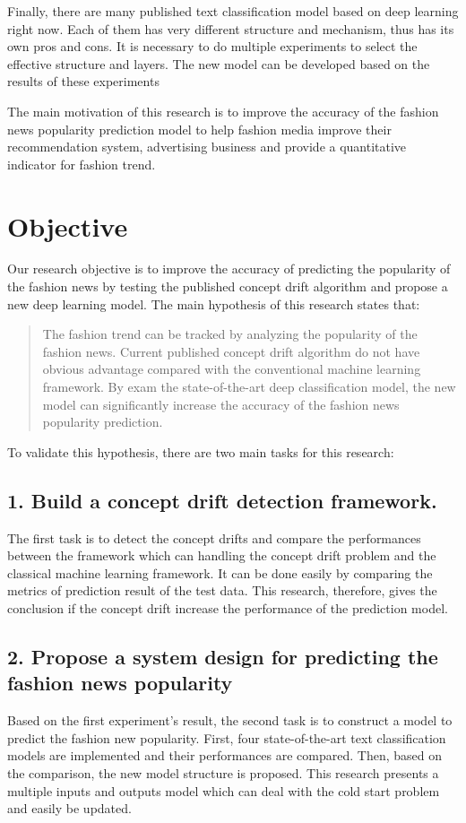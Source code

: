 Finally, there are many published text classification model based on deep learning right now. Each of them has very different structure and mechanism, thus has its own pros and cons. It is necessary to do multiple experiments to select the effective structure and layers. The new model can be developed based on the results of these experiments

The main motivation of this research is to improve the accuracy of the fashion news popularity prediction model to help fashion media improve their recommendation system, advertising business and provide a quantitative indicator for fashion trend. 


\section{Objective}
Our research objective is to improve the accuracy of predicting the popularity of the fashion news by testing the published concept drift algorithm and propose a new deep learning model. The main hypothesis of this research states that:

\begin{quote}
The fashion trend can be tracked by analyzing the popularity of the fashion news. Current published concept drift algorithm do not have obvious advantage compared with the conventional machine learning framework. By exam the state-of-the-art deep classification model, the new model can significantly increase the accuracy of the fashion news popularity prediction.

\end{quote}

To validate this hypothesis, there are two main tasks for this research:

\subsection*{1. Build a concept drift detection framework.}
The first task is to detect the concept drifts and compare the performances between the framework which can handling the concept drift problem and the classical machine learning framework. It can be done easily by comparing the metrics of prediction result of the test data. This research, therefore, gives the conclusion if the concept drift increase the performance of the prediction model. 



\subsection*{2. Propose a system design for predicting the fashion news popularity}
Based on the first experiment's result, the second task is to construct a model to predict the fashion new popularity. First, four state-of-the-art text classification models are implemented and their performances are compared.
Then, based on the comparison, the new model structure is proposed. This research presents a multiple inputs and outputs model which can deal with the cold start problem and easily be updated. 


